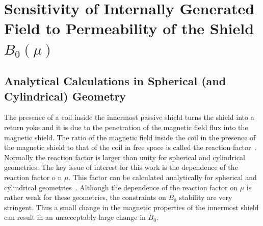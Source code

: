 \section{Sensitivity of Internally Generated Field to Permeability of the Shield $B_0(\mu)$}

\subsection{Analytical Calculations in Spherical (and Cylindrical) Geometry}



The presence of a coil inside the innermost passive shield turns the
shield into a return yoke and it is due to the penetration of the
magnetic field flux into the magnetic shield.  The ratio of the
magnetic field inside the coil in the presence of the magnetic shield
to that of the coil in free space is called the reaction
factor~\cite{bib:urankar, bib:bidinosti}.
Normally the reaction factor is larger than unity for spherical and
cylindrical geometries.  The key issue of interest for this work is
the dependence of the reaction factor o
n $\mu$.  This factor can be
calculated analytically for spherical and cylindrical
geometries~\cite{bib:bidinosti,bib:urankar}.  Although
the dependence of the reaction factor on $\mu$ is rather weak for
these geometries, the constraints on $B_0$ stability are very
stringent.  Thus a small change in the magnetic properties of the
innermost shield can result in an unacceptably large change in $B_0$.


